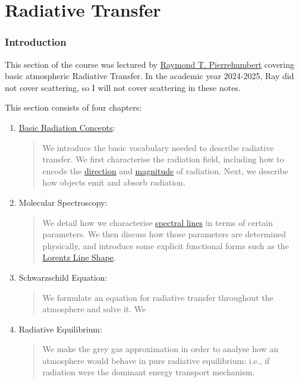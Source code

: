 \part{Radiative Transfer}\label{Radiative Transfer}

\section*{Introduction}

This section of the course was lectured by \href{https://users.physics.ox.ac.uk/~pierrehumbert/}{Raymond T. Pierrehumbert} covering basic atmospheric Radiative Transfer. In the academic year 2024-2025, Ray did not cover scattering, so I will not cover scattering in these notes.\vspace{5 mm}

\noindent This section consists of four chapters:\vspace{5 mm}

\begin{enumerate}
    \item \hyperref[Basic Thermodynamics]{Basic Radiation Concepts}: 
        
        \begin{quote}
            We introduce the basic vocabulary needed to describe radiative transfer. We first characterise the radiation field, including how to encode the \hyperref[Solid Angle Box]{direction} and \hyperref[Radiance Box]{magnitude} of radiation. Next, we describe how objects emit and absorb radiation.
        \end{quote}

    \item Molecular Spectroscopy: 
    
        \begin{quote}
            We detail how we characterise \hyperref[Line Box]{spectral lines} in terms of certain parameters. We then discuss how those parameters are determined physically, and introduce some explicit functional forms such as the \hyperref[Lorentz Box]{Lorentz Line Shape}.
        \end{quote}
    
    \item Schwarzschild Equation:
        
        \begin{quote}
            We formulate an equation for radiative transfer throughout the atmosphere and solve it. We  
        \end{quote}
    \item Radiative Equilibrium:
        
        \begin{quote}
            We make the grey gas approximation in order to analyse how an atmosphere would behave in pure radiative equilibrium: i.e., if radiation were the dominant energy transport mechanism.
        \end{quote}
\end{enumerate}

